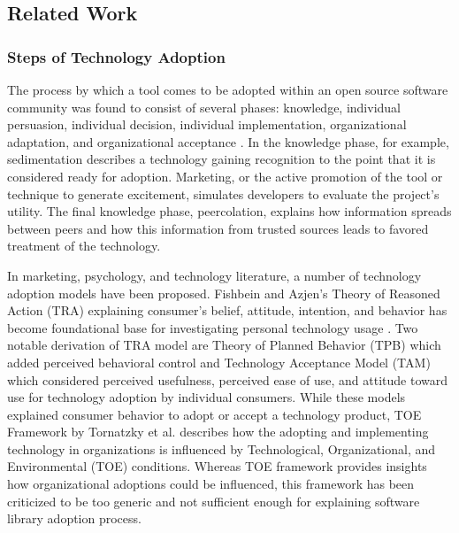 \subsection{Related Work}
\subsubsection{Steps of Technology Adoption} %
\label{sec:tech-adoption}
The process by which a tool comes to be adopted within an open source software community was found to consist of several phases: knowledge, individual persuasion, individual decision, individual implementation, organizational adaptation, and organizational acceptance \cite{krafft:2016:free}. In the knowledge phase, for example, sedimentation describes a technology gaining recognition to the point that it is considered ready for adoption. Marketing, or the active promotion of the tool or technique to generate excitement, simulates developers to evaluate the project's utility. The final knowledge phase, peercolation, explains how information spreads between peers and how this information from trusted sources leads to favored treatment of the technology.



In marketing, psychology, and technology literature, a number of technology adoption models have been proposed. Fishbein and Azjen's Theory of Reasoned Action (TRA) \cite{flanders1975belief-tra} explaining consumer's belief, attitude, intention, and behavior has become foundational base for investigating personal technology usage \cite{taherdoost2018-adoption-models}. Two notable derivation of TRA model are Theory of Planned Behavior (TPB) \cite{ajzen1991-tpb} which added perceived behavioral control and Technology Acceptance Model (TAM) \cite{davis1985tam, davis1989-tam-usefulness} which considered perceived usefulness, perceived ease of use, and attitude toward use for technology adoption by individual consumers. While these models explained consumer behavior to adopt or accept a technology product, TOE Framework by Tornatzky et al. \cite{tornatzky1990processes-toe} describes how the adopting and implementing technology in organizations is influenced by Technological, Organizational, and Environmental (TOE) conditions. Whereas TOE framework provides insights how organizational adoptions could be influenced, this framework has been criticized to be too generic \cite{zhu2005post-toe-critic} and not sufficient enough for explaining software library adoption process.



